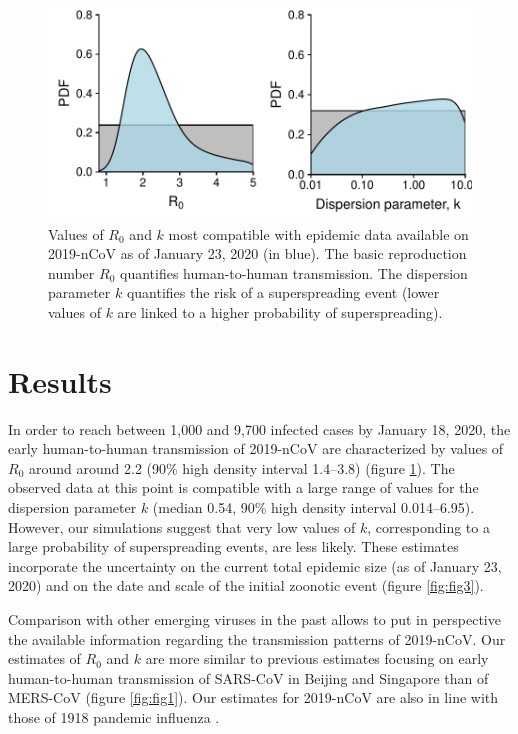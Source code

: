 \documentclass[a4]{article}
\begin{document}
\begin{figure}[b]
	\centering
	\includegraphics[width=.6\linewidth]{../figure/fig2b.pdf}
	\caption{Values of $R_0$ and $k$ most compatible with epidemic data available on 2019-nCoV as of January 23, 2020 (in blue). The basic reproduction number $R_0$ quantifies human-to-human transmission. The dispersion parameter $k$ quantifies the risk of a superspreading event (lower values of $k$ are linked to a higher probability of superspreading).}
	\label{fig:fig2}
\end{figure}


\section*{Results}
In order to reach between 1,000 and 9,700 infected cases by January 18, 2020, the early human-to-human transmission of 2019-nCoV are characterized by values of $R_0$ around around 2.2 (90\% high density interval 1.4--3.8) (figure \ref{fig:fig2}).
The observed data at this point is compatible with a large range of values for the dispersion parameter $k$ (median 0.54, 90\% high density interval 0.014--6.95).
However, our simulations suggest that very low values of $k$, corresponding to a large probability of superspreading events, are less likely.
These estimates incorporate the uncertainty on the current total epidemic size (as of January 23, 2020) and on the date and scale of the initial zoonotic event (figure \ref{fig:fig3}).


Comparison with other emerging viruses in the past allows to put in perspective the available information regarding the transmission patterns of 2019-nCoV.
Our estimates of $R_0$ and $k$ are more similar to previous estimates focusing on early human-to-human transmission of SARS-CoV in Beijing and Singapore\cite{Lloyd-Smith:2005} than of MERS-CoV\cite{Kucharski:2015b} (figure \ref{fig:fig1}).
Our estimates for 2019-nCoV are also in line with those of 1918 pandemic influenza \cite{Fraser:2011}.
\end{document}
